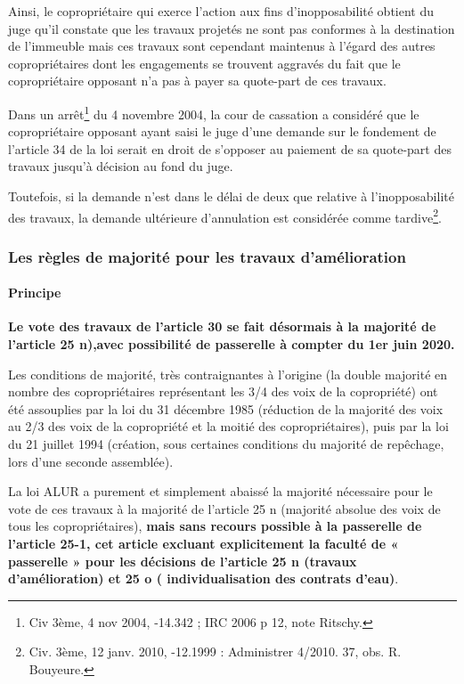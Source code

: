 				Ainsi, le copropriétaire qui exerce l'action aux fins d'inopposabilité obtient du juge qu'il constate que les travaux projetés ne sont pas conformes à la destination de l'immeuble mais ces travaux sont cependant maintenus à l'égard des autres copropriétaires dont les engagements se trouvent aggravés du fait que le copropriétaire opposant n’a pas à payer sa quote-part de ces travaux.
				
				Dans un arrêt\footnote{Civ 3ème, 4 nov 2004, -14.342 ; IRC 2006  p 12, note Ritschy.} du 4 novembre 2004, la cour de cassation a considéré que le copropriétaire opposant ayant saisi le juge d’une demande sur le fondement de l’article 34 de la loi serait en droit de s’opposer au paiement de sa quote-part des travaux jusqu’à décision au fond du juge.
				
				Toutefois, si la demande n’est dans le délai de deux que relative à l’inopposabilité des travaux, la demande ultérieure d’annulation est considérée comme tardive\footnote{Civ. 3ème, 12 janv. 2010, -12.1999 : Administrer 4/2010. 37, obs. R. Bouyeure.}.
		
		\subsubsection{Les règles de majorité pour les travaux d’amélioration}
			
			\paragraph{Principe}
			
				{\bfseries Le vote des travaux de l’article 30 se fait désormais à la majorité de l’article 25 n),avec possibilité de passerelle à compter du 1er juin 2020.}
				
				Les conditions de majorité, très contraignantes à l'origine (la double majorité en nombre des copropriétaires représentant les 3/4 des voix de la copropriété) ont été assouplies par la loi du 31 décembre 1985 (réduction de la majorité des voix au 2/3 des voix de la copropriété et la moitié des copropriétaires), puis par la loi du 21 juillet 1994 (création, sous certaines conditions du majorité de repêchage, lors d’une seconde assemblée).
				
				La loi ALUR a purement et simplement abaissé la majorité nécessaire pour le vote de ces travaux à la majorité de l’article 25 n (majorité absolue des voix de tous les copropriétaires), {\bfseries mais sans recours possible à la passerelle de l’article 25-1, cet article excluant explicitement la faculté de « passerelle » pour les décisions de l’article 25 n (travaux d’amélioration) et 25 o ( individualisation des contrats d’eau)}.
				
